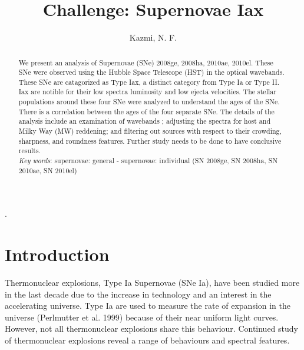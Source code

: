 \documentclass[preprint2]{aastex}
\begin{document}
\title{Challenge: Supernovae Iax }

\author{Kazmi, N. F.} 

\begin{abstract}
\noindent We present an analysis of Supernovae (SNe) 2008ge, 2008ha, 2010ae, 
2010el. These SNe were observed using the Hubble Space Telescope (HST) in the
optical wavebands.
These SNe are catagorized as Type Iax, a distinct category from Type Ia or Type II. 
Iax are notible for their low spectra luminosity and low ejecta velocities. 
The stellar populations around these four SNe were analyzed to understand
 the ages of the SNe. 
There is a correlation between the ages of the four separate SNe. 
The details of the analysis include an examination of wavebands ; 
adjusting the spectra for host and Milky Way (MW) reddening; 
and filtering out sources with respect to their crowding, sharpness, and
 roundness features.
 Further study needs to be done to have conclusive results. \\

\noindent\textit{Key words}: supernovae: general - supernovae: individual (SN 2008ge, SN 2008ha, 
SN 2010ae, SN 2010el)
\end{abstract}.

\section{Introduction}
Thermonuclear explosions, Type Ia Supernovae (SNe Ia), have been studied more in
 the last decade due to the increase in technology and an interest in the accelerating
 universe.
Type Ia are used to measure the rate of expansion in the universe
(Perlmutter et al. 1999) because of their near uniform light curves. 
However, not all thermonuclear explosions share this behaviour. 
Continued study of thermonuclear explosions reveal a range of behaviours 
and spectral features. 
\end{document}
